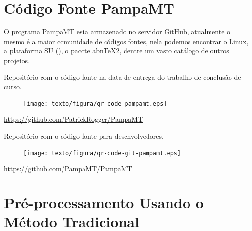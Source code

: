 \chapter{Código Fonte PampaMT}
    
    \vspace*{1cm} 
    
    O programa PampaMT esta armazenado no servidor GitHub, atualmente o mesmo é a maior comunidade de códigos fontes, nela podemos encontrar o  Linux, a plataforma SU (), o pacote abn\TeX2, dentre um vasto catálogo de outros projetos.   
    
    \vspace*{1cm}
    
    \begin{center}
    Repositório com o código fonte na data de entrega do trabalho de conclusão de curso.
    \end{center}
    
    \begin{figure}[h]
        \begin{center}
            \texttt{[image: texto/figura/qr-code-pampamt.eps]}
        \end{center}
    \end{figure}
    \begin{center}
        \url{https://github.com/PatrickRogger/PampaMT}
    \end{center}
    
    \begin{center}
    Repositório com o código fonte para desenvolvedores.
    \end{center}
    
    \begin{figure}[h]
        \begin{center}
            \texttt{[image: texto/figura/qr-code-git-pampamt.eps]}
        \end{center}
    \end{figure}
    \begin{center}
        \url{https://github.com/PampaMT/PampaMT}
    \end{center}

    \vfill
\chapter{Pré-processamento Usando o Método Tradicional}

